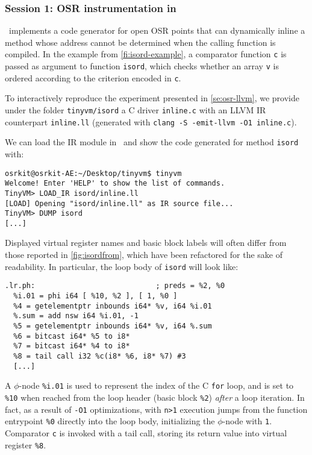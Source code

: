
\subsubsection{Session 1: OSR instrumentation in \osrkit}

\tinyvm\ implements a code generator for open OSR points that can dynamically inline a method whose address cannot be determined when the calling function is compiled. In the example from \myfigure\ref{fi:isord-example}, a comparator function {\tt c} is passed as argument to function {\tt isord}, which checks whether an array {\tt v} is ordered according to the criterion encoded in {\tt c}.

To interactively reproduce the experiment presented in \mysection\ref{se:osr-llvm}, we provide under the folder {\small\tt tinyvm/isord} a C driver {\small\tt inline.c} with an LLVM IR counterpart {\small\tt inline.ll} (generated with {\small\tt clang -S -emit-llvm -O1 inline.c}).

We can load the IR module in \tinyvm\ and show the code generated for method {\tt isord} with:
\begin{small}
\begin{verbatim}
osrkit@osrkit-AE:~/Desktop/tinyvm$ tinyvm
Welcome! Enter 'HELP' to show the list of commands.
TinyVM> LOAD_IR isord/inline.ll
[LOAD] Opening "isord/inline.ll" as IR source file...
TinyVM> DUMP isord
[...]
\end{verbatim}
\end{small}

\noindent Displayed virtual register names and basic block labels will often differ from those reported in \myfigure\ref{fig:isordfrom}, which have been refactored for the sake of readability. In particular, the loop body of {\tt isord} will look like:

\begin{small}
\begin{verbatim}
.lr.ph:                            ; preds = %2, %0
  %i.01 = phi i64 [ %10, %2 ], [ 1, %0 ]
  %4 = getelementptr inbounds i64* %v, i64 %i.01
  %.sum = add nsw i64 %i.01, -1
  %5 = getelementptr inbounds i64* %v, i64 %.sum
  %6 = bitcast i64* %5 to i8*
  %7 = bitcast i64* %4 to i8*
  %8 = tail call i32 %c(i8* %6, i8* %7) #3
  [...]
\end{verbatim}
\end{small}

\noindent A $\phi$-node {\tt \%i.01} is used to represent the index of the C {\tt for} loop, and is set to {\tt \%10} when reached from the loop header (basic block {\tt \%2}) {\em after} a loop iteration. In fact, as a result of {\small \tt -O1} optimizations, with {\tt n>1} execution jumps from the function entrypoint {\tt \%0} directly into the loop body, initializing the $\phi$-node with {\tt 1}. Comparator {\tt c} is invoked with a tail call, storing its return value into virtual register {\tt \%8}.


